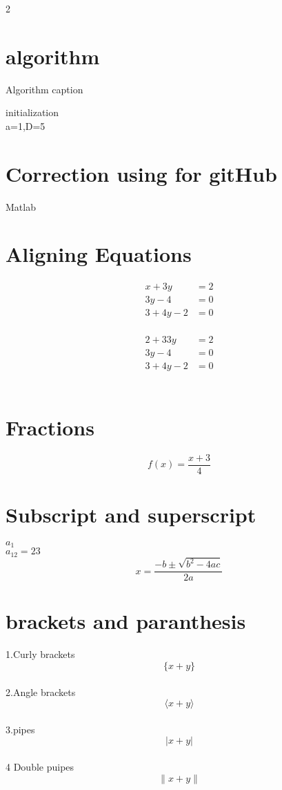 \documentclass[12pt]{book}
\begin{document}
\begin {multicols}{2}
\section{algorithm}
\begin{algorithm}[H]

\SetAlgoLined %
\caption{Algorithm caption}
initialization\\
a=1,D=5 \;

\end{algorithm}

\section{Correction using for gitHub}
\begin{algorithm}[H]
\caption{Matlab}
\end{algorithm}
\section {Aligning Equations}
\begin{align}
 x+3y &=2 \nonumber\\
 3y-4&=0 \\
 3+4y-2&=0
\end{align}\\
\begin{align*}
 2+33y &=2 \\
 3y-4&=0 \\
 3+4y-2&=0
\end{align*}\\
\section{Fractions}
$$ f(x) = \frac{x+3}{4}$$
\section {Subscript and superscript}
$ a_1 $ \\
$a_{12} =23$ \\
\begin{equation}
x=\frac{-b \pm \sqrt{b^2-4ac}}{2a} 
\end{equation}
\section{brackets and paranthesis}
1.Curly brackets $$ \{ x+y \}  $$\\
2.Angle brackets $$ \langle x+y \rangle $$\\
3.pipes $$ |x+y| $$ \\
4 Double puipes $$ \|  x+y \| $$ \\


\end{multicols}
\end{document}
